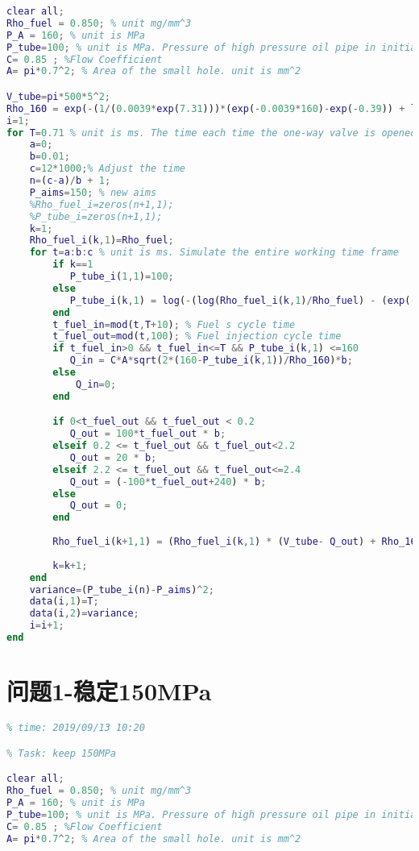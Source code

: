 \documentclass[withoutpreface,bwprint]{cumcmthesis} %
\begin{document}
\begin{appendices}
\begin{lstlisting}[language=matlab]
% Task: Increase to 150MPa in n seconds
clear all;
Rho_fuel = 0.850; % unit mg/mm^3
P_A = 160; % unit is MPa
P_tube=100; % unit is MPa. Pressure of high pressure oil pipe in initial state
C= 0.85 ; %Flow Coefficient
A= pi*0.7^2; % Area of the small hole. unit is mm^2

V_tube=pi*500*5^2;
Rho_160 = exp(-(1/(0.0039*exp(7.31)))*(exp(-0.0039*160)-exp(-0.39)) + log(0.85)) ; % Fuel density at a pressure of 160 MPa
i=1;
for T=0.71 % unit is ms. The time each time the one-way valve is opened1
    a=0;
    b=0.01;
    c=12*1000;% Adjust the time
    n=(c-a)/b + 1;
    P_aims=150; % new aims
    %Rho_fuel_i=zeros(n+1,1);
    %P_tube_i=zeros(n+1,1);
    k=1;
    Rho_fuel_i(k,1)=Rho_fuel;
    for t=a:b:c % unit is ms. Simulate the entire working time frame
        if k==1
           P_tube_i(1,1)=100;
        else
           P_tube_i(k,1) = log(-(log(Rho_fuel_i(k,1)/Rho_fuel) - (exp(-0.39)/(0.0039*exp(7.31))))*0.0039*exp(7.31))*(-1/0.0039);
        end
        t_fuel_in=mod(t,T+10); % Fuel s cycle time
        t_fuel_out=mod(t,100); % Fuel injection cycle time
        if t_fuel_in>0 && t_fuel_in<=T && P_tube_i(k,1) <=160
           Q_in = C*A*sqrt(2*(160-P_tube_i(k,1))/Rho_160)*b;
        else
            Q_in=0;
        end

        if 0<t_fuel_out && t_fuel_out < 0.2 
           Q_out = 100*t_fuel_out * b;
        elseif 0.2 <= t_fuel_out && t_fuel_out<2.2
           Q_out = 20 * b;
        elseif 2.2 <= t_fuel_out && t_fuel_out<=2.4
           Q_out = (-100*t_fuel_out+240) * b;
        else
           Q_out = 0;
        end
        
        Rho_fuel_i(k+1,1) = (Rho_fuel_i(k,1) * (V_tube- Q_out) + Rho_160 * Q_in) /V_tube;
        
        k=k+1;
    end
    variance=(P_tube_i(n)-P_aims)^2;
    data(i,1)=T;
    data(i,2)=variance;
    i=i+1;
end

\end{lstlisting}

\section{问题1-稳定150MPa} 
\begin{lstlisting}[language=matlab]
% 2019_A Q1_(2)
% time: 2019/09/13 10:20

% Task: keep 150MPa

clear all;
Rho_fuel = 0.850; % unit mg/mm^3
P_A = 160; % unit is MPa
P_tube=100; % unit is MPa. Pressure of high pressure oil pipe in initial state
C= 0.85 ; %Flow Coefficient
A= pi*0.7^2; % Area of the small hole. unit is mm^2


\end{lstlisting}
\end{appendices}
\end{document}
